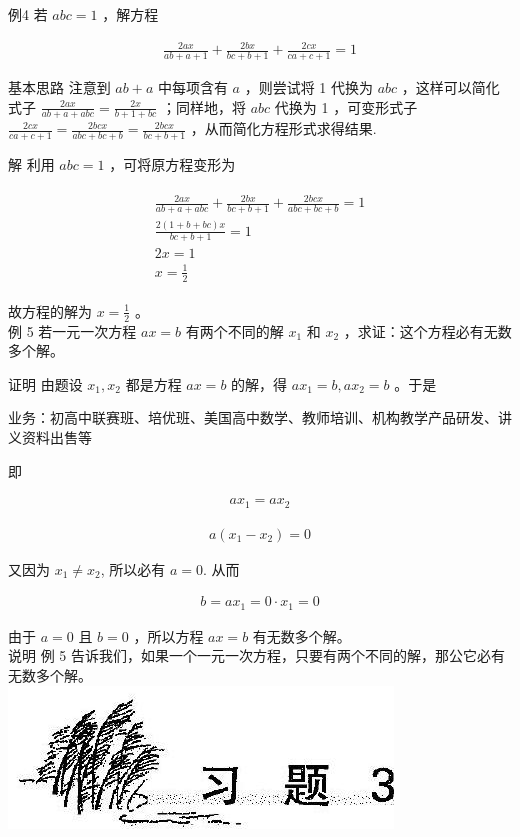 \documentclass[10pt]{article}
\begin{document}
例4 若 $a b c=1$ ，解方程

\begin{align*}
\frac{2 a x}{a b+a+1}+\frac{2 b x}{b c+b+1}+\frac{2 c x}{c a+c+1}=1
\end{align*}

基本思路 注意到 $a b+a$ 中每项含有 $a$ ，则尝试将 1 代换为 $a b c$ ，这样可以简化式子 $\frac{2 a x}{a b+a+a b c}=\frac{2 x}{b+1+b c}$ ；同样地，将 $a b c$ 代换为 1 ，可变形式子 $\frac{2 c x}{c a+c+1}=\frac{2 b c x}{a b c+b c+b}=\frac{2 b c x}{b c+b+1}$ ，从而简化方程形式求得结果.

解 利用 $a b c=1$ ，可将原方程变形为

\begin{align*}
\begin{gathered}
\frac{2 a x}{a b+a+a b c}+\frac{2 b x}{b c+b+1}+\frac{2 b c x}{a b c+b c+b}=1 \\
\frac{2(1+b+b c) x}{b c+b+1}=1 \\
2 x=1 \\
x=\frac{1}{2}
\end{gathered}
\end{align*}

故方程的解为 $x=\frac{1}{2}$ 。\\
例 5 若一元一次方程 $a x=b$ 有两个不同的解 $x_{1}$ 和 $x_{2}$ ，求证：这个方程必有无数多个解。

证明 由题设 $x_{1}, x_{2}$ 都是方程 $a x=b$ 的解，得 $a x_{1}=b, a x_{2}=b$ 。于是

业务：初高中联赛班、培优班、美国高中数学、教师培训、机构教学产品研发、讲义资料出售等

即

\begin{align*}
a x_{1}=a x_{2}
\end{align*}

\begin{align*}
a\left(x_{1}-x_{2}\right)=0
\end{align*}

又因为 $x_{1} \neq x_{2}$, 所以必有 $a=0$. 从而

\begin{align*}
b=a x_{1}=0 \cdot x_{1}=0
\end{align*}

由于 $a=0$ 且 $b=0$ ，所以方程 $a x=b$ 有无数多个解。\\
说明 例 5 告诉我们，如果一个一元一次方程，只要有两个不同的解，那公它必有无数多个解。\\
\includegraphics[max width=\textwidth, center]{2024_10_30_26b590fd1106d28139f0g-017}
\end{document}

